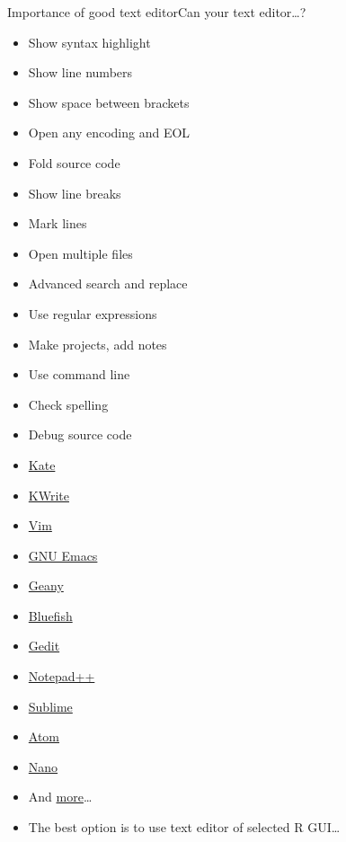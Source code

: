 \documentclass[compress, ucs, xelatex, 11pt, xcolor=svgnames,
  hyperref={
    bookmarks=true,
    unicode=true,
    colorlinks=true,
    pdftitle={Molecular data in R},
    plainpages=false,
    pdfauthor={Vojtech Zeisek},
    pdfsubject={Course about phylogeny and evolution in R},
    pdfcreator={XeLaTeX},
    pdfkeywords={R, evolution, phylogeny, molecular data},
    linkcolor=Tomato,
    anchorcolor=SaddleBrown,
    citecolor=Goldenrod,
    filecolor=DarkMagenta,
    menucolor=Sienna,
    urlcolor=DarkTurquoise,
    pdftex},
  url={hyphens, lowtilde} %
  ]{beamer}
\begin{document}
\begin{frame}{Importance of good text editor}{Can your text editor\ldots ?}
  \label{editors}
  \begin{multicols}{2}
    \begin{itemize}
      \item Show syntax highlight
      \item Show line numbers
      \item Show space between brackets
      \item Open any encoding and EOL
      \item Fold source code
      \item Show line breaks
      \item Mark lines
      \item Open multiple files
      \item Advanced search and replace
      \item Use regular expressions
      \item Make projects, add notes
      \item Use command line
      \item Check spelling
      \item Debug source code
    \end{itemize}
  \end{multicols}
  \vfill
  \vfill
  \begin{multicols}{4}
    \begin{itemize}
      \item \href{https://kate-editor.org/}{Kate}
      \item \href{https://www.kde.org/applications/utilities/kwrite/}{KWrite}
      \item \href{http://www.vim.org/}{Vim}
      \item \href{https://en.wikipedia.org/wiki/Emacs}{GNU Emacs}
      \item \href{https://www.geany.org/}{Geany}
      \item \href{https://bluefish.openoffice.nl/}{Bluefish}
      \item \href{https://wiki.gnome.org/Apps/Gedit}{Gedit}
      \item \href{https://notepad-plus-plus.org/}{Notepad++}
      \item \href{https://www.sublimetext.com/}{Sublime}
      \item \href{https://atom.io/}{Atom}
      \item \href{https://www.nano-editor.org/}{Nano}
      \item And \href{https://en.wikipedia.org/wiki/List_of_text_editors}{more}\ldots
    \end{itemize}
  \end{multicols}
  \vfil
  \begin{itemize}
    \item The best option is to use text editor of selected R GUI\ldots
  \end{itemize}
\end{frame}
\end{document}
